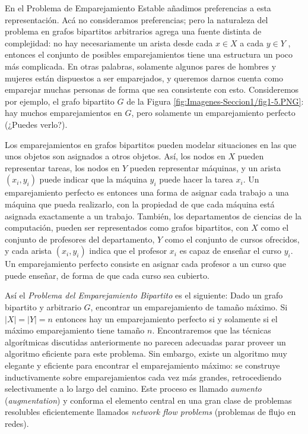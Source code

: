 \documentclass[a4paper, 12pt]{book}
\begin{document}
En el Problema de Emparejamiento Estable añadimos preferencias a esta representación. Acá no consideramos preferencias; pero la naturaleza del problema en grafos bipartitos arbitrarios agrega una fuente distinta de complejidad: no hay necesariamente un arista desde cada $x \in X$ a cada $y \in Y$ , entonces el conjunto de posibles emparejamientos tiene una estructura un poco más complicada. En otras palabras, solamente algunos pares de hombres y mujeres están dispuestos a ser emparejados, y queremos darnos cuenta como emparejar muchas personas de forma que sea consistente con esto. Consideremos por ejemplo, el grafo bipartito $G$ de la Figura \ref{fig:Imagenes-Seccion1/fig1-5.PNG}: hay muchos emparejamientos en $G$, pero solamente un emparejamiento perfecto (¿Puedes verlo?).

Los emparejamientos en grafos bipartitos pueden modelar situaciones en las que unos objetos son asignados a otros objetos. Así, los nodos en $X$ pueden representar tareas, los nodos en $Y$ pueden representar máquinas, y un arista $(x_i,y_i)$ puede indicar que la máquina $y_i$ puede hacer la tarea $x_i$. Un emparejamiento perfecto es entonces una forma de asignar cada trabajo a una máquina que pueda realizarlo, con la propiedad de que cada máquina está asignada exactamente a un trabajo. También, los departamentos de ciencias de la computación, pueden ser representados como grafos bipartitos, con $X$ como el conjunto de profesores del departamento, $Y$ como el conjunto de cursos ofrecidos, y cada arista $(x_i, y_i)$ indica que el profesor $x_i$ es capaz de enseñar el curso $y_i$. Un emparejamiento perfecto consiste en asignar cada profesor a un curso que puede enseñar, de forma de que cada curso sea cubierto.

Así el \textit{Problema del Emparejamiento Bipartito} es el siguiente: Dado un grafo bipartito y arbitrario $G$, encontrar un emparejamiento de tamaño máximo. Si $|X| = |Y| = n$ entonces hay un emparejamiento perfecto si y solamente si el máximo emparejamiento tiene tamaño $n$. Encontraremos que las técnicas algorítmicas discutidas anteriormente no parecen adecuadas parar proveer un algoritmo eficiente para este problema. Sin embargo, existe un algoritmo muy elegante y eficiente para encontrar el emparejamiento máximo: se construye inductivamente sobre emparejamientos cada vez más grandes, retrocediendo selectivamente a lo largo del camino. Este proceso es llamado \textit{aumento} (\textit{augmentation}) y conforma el elemento central en una gran clase de problemas resolubles eficientemente llamados \textit{network flow problems} (problemas de flujo en redes).
\end{document}
